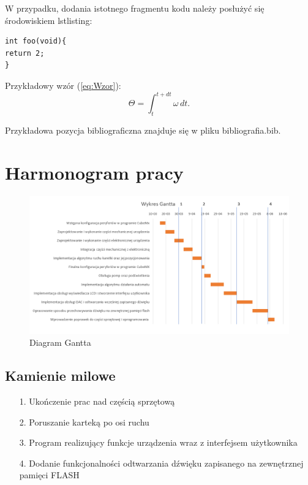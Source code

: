 \documentclass[10pt, a4paper]{article}
\begin{document}
W przypadku, dodania istotnego fragmentu kodu należy posłużyć się środowiskiem 
lstlisting:

\begin{lstlisting}[tabsize=2]
int foo(void){
return 2;
}
\end{lstlisting}

Przykładowy wzór (\ref{eq:Wzor}):
\begin{equation}
\label{eq:Wzor}
\Theta = \int_t^{t+dt} \omega \, dt.	
\end{equation}

Przykładowa pozycja bibliograficzna \cite{SR01} znajduje się 
w pliku bibliografia.bib.


\section{Harmonogram pracy}


\begin{figure}[H]
	\centering
	\includegraphics[width=1.4\textwidth,angle=270]{gant.PNG}
	\caption{Diagram Gantta}
	\label{fig:DiagramGantta}
\end{figure}

\subsection{Kamienie milowe}

\begin{itemize}

\item [1.] Ukończenie prac nad częścią sprzętową
\item [2.] Poruszanie karteką po osi ruchu
\item [3.] Program realizujący funkcje urządzenia wraz z interfejsem użytkownika
\item [4.]Dodanie funkcjonalności odtwarzania dźwięku zapisanego na zewnętrznej pamięci FLASH

\end{itemize}
\end{document}
